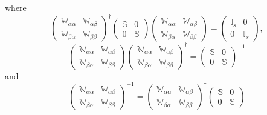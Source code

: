 \documentclass{article}
\begin{document}
where 
\begin{equation}
\left( 
\begin{array}{cc}
\mathbb{W}_{\alpha \alpha } & \mathbb{W}_{\alpha \beta } \\ 
\mathbb{W}_{\beta \alpha } & \mathbb{W}_{\beta \beta }%
\end{array}%
\right) ^{\dagger }\left( 
\begin{array}{cc}
\mathbb{S} & 0 \\ 
0 & \mathbb{S}%
\end{array}%
\right) \left( 
\begin{array}{cc}
\mathbb{W}_{\alpha \alpha } & \mathbb{W}_{\alpha \beta } \\ 
\mathbb{W}_{\beta \alpha } & \mathbb{W}_{\beta \beta }%
\end{array}%
\right) =\left( 
\begin{array}{cc}
\mathbb{I}_{s} & 0 \\ 
0 & \mathbb{I}_{s}%
\end{array}%
\right) ,
\end{equation}%
\begin{equation}
\left( 
\begin{array}{cc}
\mathbb{W}_{\alpha \alpha } & \mathbb{W}_{\alpha \beta } \\ 
\mathbb{W}_{\beta \alpha } & \mathbb{W}_{\beta \beta }%
\end{array}%
\right) \left( 
\begin{array}{cc}
\mathbb{W}_{\alpha \alpha } & \mathbb{W}_{\alpha \beta } \\ 
\mathbb{W}_{\beta \alpha } & \mathbb{W}_{\beta \beta }%
\end{array}%
\right) ^{\dagger }=\left( 
\begin{array}{cc}
\mathbb{S} & 0 \\ 
0 & \mathbb{S}%
\end{array}%
\right) ^{-1}
\end{equation}%
and 
\begin{equation}
\left( 
\begin{array}{cc}
\mathbb{W}_{\alpha \alpha } & \mathbb{W}_{\alpha \beta } \\ 
\mathbb{W}_{\beta \alpha } & \mathbb{W}_{\beta \beta }%
\end{array}%
\right) ^{-1}=\left( 
\begin{array}{cc}
\mathbb{W}_{\alpha \alpha } & \mathbb{W}_{\alpha \beta } \\ 
\mathbb{W}_{\beta \alpha } & \mathbb{W}_{\beta \beta }%
\end{array}%
\right) ^{\dagger }\left( 
\begin{array}{cc}
\mathbb{S} & 0 \\ 
0 & \mathbb{S}%
\end{array}%
\right)
\end{equation}%
\end{document}
